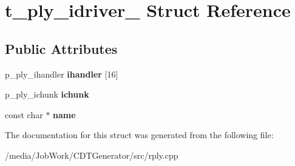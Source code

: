\hypertarget{structt__ply__idriver__}{\section{t\-\_\-ply\-\_\-idriver\-\_\- Struct Reference}
\label{structt__ply__idriver__}
}
\subsection*{Public Attributes}
\begin{DoxyCompactItemize}
\item 
\hypertarget{structt__ply__idriver___afabd4f3eef6f708d9872c623f5d48324}{p\-\_\-ply\-\_\-ihandler {\bfseries ihandler} \mbox{[}16\mbox{]}}\label{structt__ply__idriver___afabd4f3eef6f708d9872c623f5d48324}

\item 
\hypertarget{structt__ply__idriver___a317e387dd6c97231d081c71b5e705b28}{p\-\_\-ply\-\_\-ichunk {\bfseries ichunk}}\label{structt__ply__idriver___a317e387dd6c97231d081c71b5e705b28}

\item 
\hypertarget{structt__ply__idriver___a51009fbc3df6433214fd19a34f0aac02}{const char $\ast$ {\bfseries name}}\label{structt__ply__idriver___a51009fbc3df6433214fd19a34f0aac02}

\end{DoxyCompactItemize}


The documentation for this struct was generated from the following file\-:\begin{DoxyCompactItemize}
\item 
/media/\-Job\-Work/\-C\-D\-T\-Generator/src/rply.\-cpp\end{DoxyCompactItemize}
